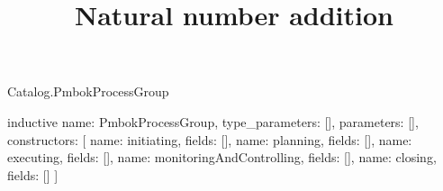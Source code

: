 \begin{lexlean}{Catalog.PmbokProcessGroup}
\title{Natural number addition}
\begin{semanticmodule}
inductive{
  name: PmbokProcessGroup,
  type_parameters: [],
  parameters: [],
  constructors: [
    {name: initiating, fields: []},
    {name: planning, fields: []},
    {name: executing, fields: []},
    {name: monitoringAndControlling, fields: []},
    {name: closing, fields: []}
  ]
}
\end{semanticmodule}
\end{lexlean}
